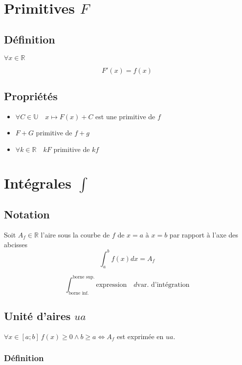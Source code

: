 \documentclass{article}
\newcommand{\R}{\mathds{R}}
\begin{document}
\newpage
\section{Primitives $F$}

\subsection{Définition}

$\forall x \in \R$

\[F'(x) = f(x)\]

\subsection{Propriétés}

\begin{itemize}
    \item $\forall C \in \mathds{U}\quad x \mapsto F(x) + C$ est une primitive de $f$
    \item $F + G$ primitive de $f + g$
    \item $\forall k \in \R \quad kF$ primitive de $kf$
\end{itemize}

\newpage
\label{integrales}
\section{Intégrales $\int$}

\subsection{Notation}

Soit $A_f \in \R$ l'aire sous la courbe de $f$ de $x = a$ à $x = b$ par rapport à l'axe des abcisses
\[\int_a^b f(x) dx = A_f\]

\[\int_\text{borne inf.}^\text{borne sup.} \text{expression}\quad d\text{var. d'intégration}\]

\subsection{Unité d'aires $ua$}

$\forall x \in [a; b] \: f(x) \geq 0 \land b \geq a \iff A_f$ est exprimée en $ua$.

\subsubsection{Définition}
\end{document}
